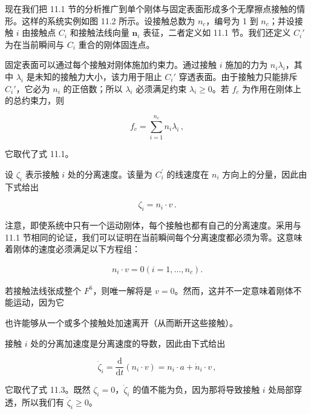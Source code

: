 \documentclass[10pt,a4paper]{book}
\theoremstyle{thmstyle} %
\theoremstyle{defstyle} %
\theoremstyle{prostyle} %
\begin{document}
现在我们把 11.1 节的分析推广到单个刚体与固定表面形成多个无摩擦点接触的情形。这样的系统实例如图 11.2 所示。设接触总数为 $n_c$，编号为 1 到 $n_c$；并设接触 $i$ 由接触点 $C_i$ 和接触法线向量 $\mathbf{n}_i$ 表征，二者定义如 11.1 节。我们还定义 $C_i'$ 为在当前瞬间与 $C_i$ 重合的刚体固连点。



固定表面可以通过每个接触对刚体施加约束力。通过接触 $i$ 施加的力为 $n_i\lambda_i$，其中 $\lambda_i$ 是未知的接触力大小，该力用于阻止 $C_i'$ 穿透表面。由于接触力只能排斥 $C_i'$，它必为 $n_i$ 的正倍数；所以 $\lambda_i$ 必须满足约束 $\lambda_i \geq 0$。若 $f_c$ 为作用在刚体上的总约束力，则



$$
f _ { c } = \sum _ { i = 1 } ^{n _ { c} } n _ { i } \lambda _ { i } \, ,
$$



它取代了式 11.1。



设 $\zeta_{i}$ 表示接触 $i$ 处的分离速度。该量为 $C_{i}^{\prime}$ 的线速度在 $n_{i}$ 方向上的分量，因此由下式给出



$$
\zeta _ { i } = n _ { i } \cdot v \, .
$$



注意，即使系统中只有一个运动刚体，每个接触也都有自己的分离速度。采用与 11.1 节相同的论证，我们可以证明在当前瞬间每个分离速度都必须为零。这意味着刚体的速度必须满足以下方程组：



$$
\begin{array}{r} { n _ { i } \cdot v = 0  ( i = 1 , \ldots , n _ { c } ) . } \end{array}
$$



若接触法线张成整个 $F^{6}$，则唯一解将是 $v=0$。然而，这并不一定意味着刚体不能运动，因为它



也许能够从一个或多个接触处加速离开（从而断开这些接触）。



接触 $i$ 处的分离加速度是分离速度的导数，因此由下式给出



$$
\dot { \zeta } _ { i } = \frac { \mathrm { d } } { \mathrm { d } t } ( n _ { i } \cdot v ) = n _ { i } \cdot a + \dot { n } _ { i } \cdot v \, ,
$$



它取代了式 11.3。既然 $\zeta_{i}=0$，$\dot{\zeta}_{i}$ 的值不能为负，因为那将导致接触 $i$ 处局部穿透，所以我们有 $\dot{\zeta}_{i}\geq0$。
\end{document}
